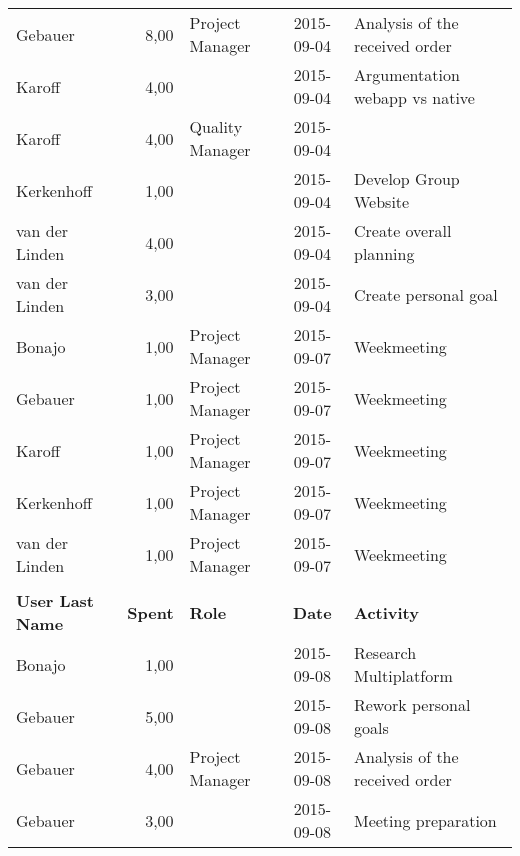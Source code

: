 \begin{longtable}{ l r p{2cm} c p{4cm}}
		Gebauer                 & 8,00           & Project Manager & 2015-09-04    & Analysis of the received order                  \\
		Karoff                  & 4,00           &                 & 2015-09-04    & Argumentation webapp vs native                  \\
		Karoff                  & 4,00           & Quality Manager & 2015-09-04    &                                                 \\
		Kerkenhoff              & 1,00           &                 & 2015-09-04    & Develop Group Website                            \\
		van der Linden          & 4,00           &                 & 2015-09-04    & Create overall planning                         \\
		van der Linden          & 3,00           &                 & 2015-09-04    & Create personal goal                            \\
		Bonajo                  & 1,00           & Project Manager & 2015-09-07    & Weekmeeting                                     \\
		Gebauer                 & 1,00           & Project Manager & 2015-09-07    & Weekmeeting                                     \\
		Karoff                  & 1,00           & Project Manager & 2015-09-07    & Weekmeeting                                     \\
		Kerkenhoff              & 1,00           & Project Manager & 2015-09-07    & Weekmeeting                                     \\
		van der Linden          & 1,00           & Project Manager & 2015-09-07    & Weekmeeting                                     \\\\
		\textbf{User Last Name} & \textbf{Spent} & \textbf{Role} & \textbf{Date} & \textbf{Activity} \\
		\hline
		Bonajo                  & 1,00           &                 & 2015-09-08    & Research Multiplatform                          \\
		Gebauer                 & 5,00           &                 & 2015-09-08    & Rework personal goals                           \\
		Gebauer                 & 4,00           & Project Manager & 2015-09-08    & Analysis of the received order                  \\
		Gebauer                 & 3,00           &                 & 2015-09-08    & Meeting preparation                             \\

\end{longtable}
